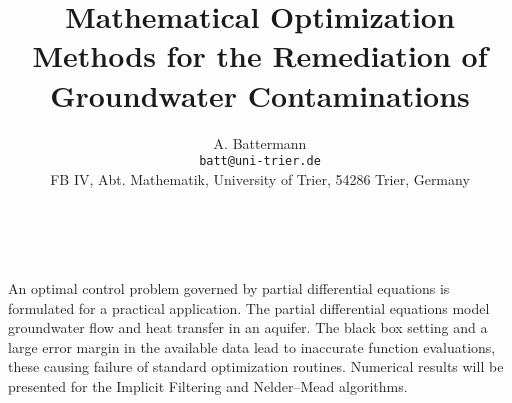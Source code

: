 \documentclass[11pt]{article}
\date{ ~ \hspace{-4mm}}
\title{Mathematical Optimization Methods         for the Remediation of         Groundwater Contaminations  }
\author{A. Battermann \\ {\tt batt@uni-trier.de} \\ FB IV, Abt. Mathematik, University of Trier, 54286 Trier, Germany}
\begin{document}
\maketitle
\thispagestyle{empty}





 



An optimal control problem governed by 
partial differential equations is 
formulated for a practical application. 
The partial differential equations model 
groundwater flow and heat transfer in an aquifer. 
The black box setting and a large error margin in the available 
data lead to inaccurate function evaluations, 
these causing failure of 
standard optimization routines. 
Numerical results will be presented for the 
Implicit Filtering and Nelder--Mead algorithms.
\end{document}
